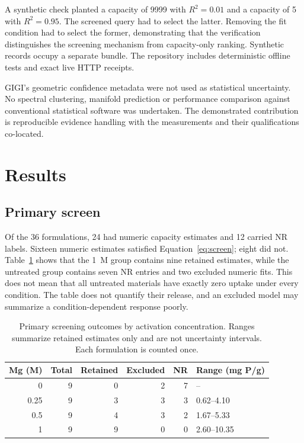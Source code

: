 \documentclass[11pt,letterpaper]{article}
\begin{document}
A synthetic check planted a capacity of 9999 with $R^2=0.01$ and a capacity of 5 with $R^2=0.95$. The screened query had to select the latter. Removing the fit condition had to select the former, demonstrating that the verification distinguishes the screening mechanism from capacity-only ranking. Synthetic records occupy a separate bundle. The repository includes deterministic offline tests and exact live HTTP receipts.

GIGI's geometric confidence metadata were not used as statistical uncertainty. No spectral clustering, manifold prediction or performance comparison against conventional statistical software was undertaken. The demonstrated contribution is reproducible evidence handling with the measurements and their qualifications co-located.

\section{Results}
\subsection{Primary screen}
Of the 36 formulations, 24 had numeric capacity estimates and 12 carried NR labels. Sixteen numeric estimates satisfied Equation~\ref{eq:screen}; eight did not. Table~\ref{tab:activation} shows that the 1~M group contains nine retained estimates, while the untreated group contains seven NR entries and two excluded numeric fits. This does not mean that all untreated materials have exactly zero uptake under every condition. The table does not quantify their release, and an excluded model may summarize a condition-dependent response poorly.

\begin{table}[htbp]
\centering\small
\caption{Primary screening outcomes by activation concentration. Ranges summarize retained estimates only and are not uncertainty intervals. Each formulation is counted once.}
\label{tab:activation}
\begin{tabular}{@{}rrrrrl@{}}
\toprule
Mg (M) & Total & Retained & Excluded & NR & Range (mg P/g)\\
\midrule
0 & 9 & 0 & 2 & 7 & -- \\
0.25 & 9 & 3 & 3 & 3 & 0.62--4.10 \\
0.5 & 9 & 4 & 3 & 2 & 1.67--5.33 \\
1 & 9 & 9 & 0 & 0 & 2.60--10.35 \\
\bottomrule
\end{tabular}
\end{table}
\end{document}
